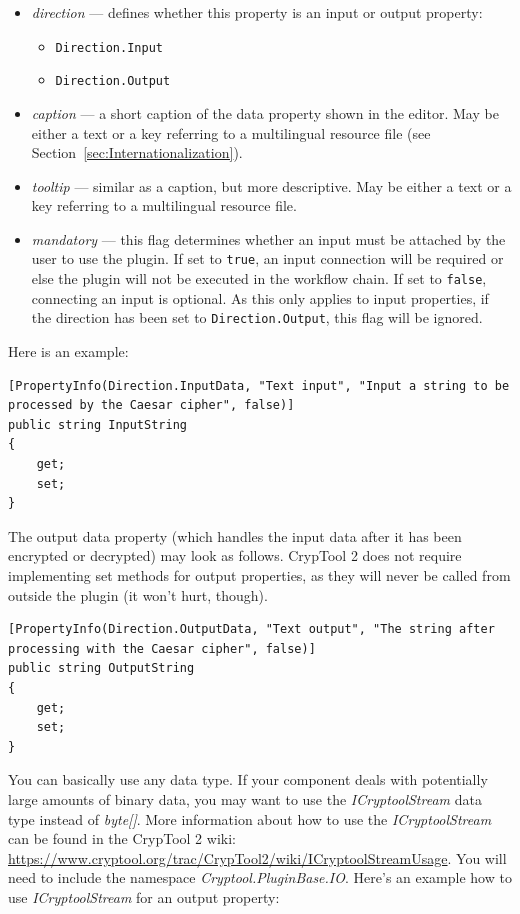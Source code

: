 \begin{itemize}
	\item \textit{direction} --- defines whether this property is an input or output property:
	\begin{itemize}
		\item \texttt{Direction.Input}
		\item \texttt{Direction.Output}
	\end{itemize}
	\item \textit{caption} --- a short caption of the data property shown in the editor. May be either a text or a key referring to a multilingual resource file (see Section~\ref{sec:Internationalization}).
	\item \textit{tooltip} --- similar as a caption, but more descriptive. May be either a text or a key referring to a multilingual resource file.
	\item \textit{mandatory} --- this flag determines whether an input must be attached by the user to use the plugin. If set to \texttt{true}, an input connection will be required or else the plugin will not be executed in the workflow chain. If set to \texttt{false}, connecting an input is optional. As this only applies to input properties, if the direction has been set to \texttt{Direction.Output}, this flag will be ignored.

\end{itemize}

Here is an example:
\clearpage

\begin{lstlisting}
[PropertyInfo(Direction.InputData, "Text input", "Input a string to be processed by the Caesar cipher", false)]
public string InputString
{
	get;
	set;
}
\end{lstlisting}

The output data property (which handles the input data after it has been encrypted or decrypted) may look as follows. CrypTool 2 does not require implementing set methods for output properties, as they will never be called from outside the plugin (it won't hurt, though).

\begin{lstlisting}
[PropertyInfo(Direction.OutputData, "Text output", "The string after processing with the Caesar cipher", false)]
public string OutputString
{
	get;
	set;
}
\end{lstlisting}

You can basically use any data type. If your component deals with potentially large amounts of binary data, you may want to use the \textit{ICryptoolStream} data type instead of \textit{byte[]}. More information about how to use the \textit{ICryptoolStream} can be found in the CrypTool 2 wiki: \url{https://www.cryptool.org/trac/CrypTool2/wiki/ICryptoolStreamUsage}. You will need to include the namespace \textit{Cryptool.PluginBase.IO}. Here's an example how to use \textit{ICryptoolStream} for an output property:

